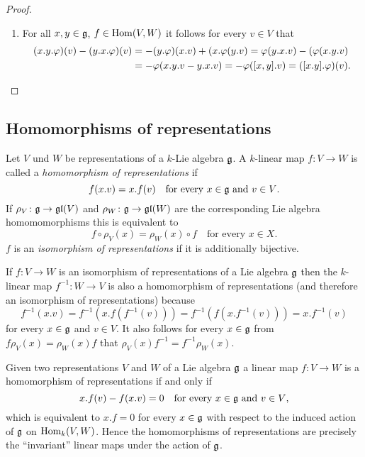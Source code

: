 \begin{proof}
\begin{enumerate}[leftmargin=*]
  \item
   For all $x,y \in \mathfrak{g}$, $f \in \operatorname{Hom}(V,W)$ it follows for every $v \in V$ that
   \begin{align*}
    (x.y.\varphi)(v) - (y.x.\varphi)(v)
    &= -(y.\varphi)(x.v) + (x.\varphi(y.v)
    = \varphi(y.x.v) - (\varphi(x.y.v) \\
    &= -\varphi(x.y.v - y.x.v)
    = -\varphi([x,y].v)
    = ([x.y].\varphi)(v).
   \qedhere
   \end{align*}
 \end{enumerate}
\end{proof}





\subsection{Homomorphisms of representations}


\begin{defi}
 Let $V$ und $W$ be representations of a $k$-Lie algebra $\mathfrak{g}$. A $k$-linear map $f \colon V \to W$ is called a \emph{homomorphism of representations} if
 \[
  f(x.v) = x.f(v) \quad \text{for every $x \in \mathfrak{g}$ and $v \in V$}.
 \]
 If $\rho_V \colon \mathfrak{g} \to \mathfrak{gl}(V)$ and $\rho_W \colon \mathfrak{g} \to \mathfrak{gl}(W)$ are the corresponding Lie algebra homomomorphisms this is equivalent to
 \[
  f \circ \rho_V(x) = \rho_W(x) \circ f \quad \text{for every $x \in X$}.
 \]
 $f$ is an \emph{isomorphism of representations} if it is additionally bijective.
\end{defi}


\begin{rem}
 If $f \colon V \to W$ is an isomorphism of representations of a Lie algebra $\mathfrak{g}$ then the $k$-linear map $f^{-1} \colon W \to V$ is also a homomorphism of representations (and therefore an isomorphism of representations) because
 \[
  f^{-1}(x.v) = f^{-1}(x.f(f^{-1}(v))) = f^{-1}(f(x.f^{-1}(v))) = x.f^{-1}(v)
 \]
 for every $x \in \mathfrak{g}$ and $v \in V$. It also follows for every $x \in \mathfrak{g}$ from $f \rho_V(x) = \rho_W(x) f$ that $\rho_V(x) f^{-1} = f^{-1} \rho_W(x)$.
\end{rem}


\begin{rem}
 Given two representations $V$ and $W$ of a Lie algebra $\mathfrak{g}$ a linear map $f \colon V \to W$ is a homomorphism of representations if and only if
 \[
  x.f(v) - f(x.v) = 0 \quad \text{for every $x \in \mathfrak{g}$ and $v \in V$},
 \]
 which is equivalent to $x.f = 0$ for every $x \in \mathfrak{g}$ with respect to the induced action of $\mathfrak{g}$ on $\operatorname{Hom}_k(V,W)$. Hence the homomorphisms of representations are precisely the ``invariant'' linear maps under the action of $\mathfrak{g}$.
\end{rem}


